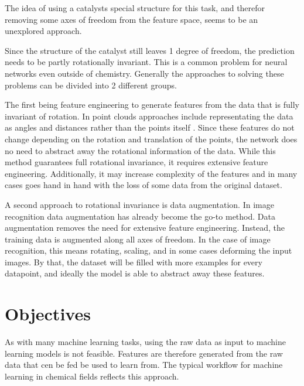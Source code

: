 The idea of using a catalysts special structure for this task, and therefor removing some axes of freedom from the feature space, seems to be an unexplored approach.

Since the structure of the catalyst still leaves 1 degree of freedom, the prediction needs to be partly rotationally invariant.
This is a common problem for neural networks even outside of chemistry.
Generally the approaches to solving these problems can be divided into 2 different groups.

The first being feature engineering to generate features from the data that is fully invariant of rotation.
In point clouds approaches include representating the data as angles and distances rather than the points itself \cite{8886052,weiler20183D}.
Since these features do not change depending on the rotation and translation of the points, the network does no need to 
abstract away the rotational information of the data.
While this method guarantees full rotational invariance, it requires extensive feature engineering.
Additionally, it may increase complexity of the features and in many cases 
goes hand in hand with the loss of some data from the original dataset. %

A second approach to rotational invariance is data augmentation.
In image recognition data augmentation has already become the go-to method.
Data augmentation removes the need for extensive feature engineering.
Instead, the training data is augmented along all axes of freedom.
In the case of image recognition, this means rotating, scaling, and in some cases deforming the input images.
By that, the dataset will be filled with more examples for every datapoint, and ideally the model is able to 
abstract away these features. %

\section{Objectives}

As with many machine learning tasks, using the raw data as input to machine learning models is not feasible.
Features are therefore generated from the raw data that cen be fed be used to learn from.
The typical workflow for machine learning in chemical fields reflects this approach.

